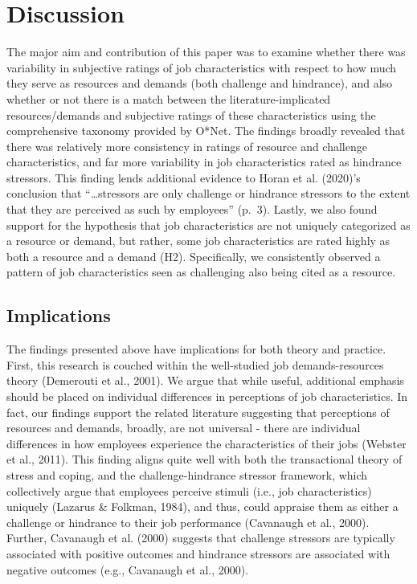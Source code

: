 \documentclass[
  english,
  man]{apa6}
\begin{document}
\hypertarget{discussion}{%
\section{Discussion}\label{discussion}}

The major aim and contribution of this paper was to examine whether there was variability in subjective ratings of job characteristics with respect to how much they serve as resources and demands (both challenge and hindrance), and also whether or not there is a match between the literature-implicated resources/demands and subjective ratings of these characteristics using the comprehensive taxonomy provided by O*Net. The findings broadly revealed that there was relatively more consistency in ratings of resource and challenge characteristics, and far more variability in job characteristics rated as hindrance stressors. This finding lends additional evidence to Horan et al. (2020)'s conclusion that ``\ldots stressors are only challenge or hindrance stressors to the extent that they are perceived as such by employees'' (p.~3). Lastly, we also found support for the hypothesis that job characteristics are not uniquely categorized as a resource or demand, but rather, some job characteristics are rated highly as both a resource and a demand (H2). Specifically, we consistently observed a pattern of job characteristics seen as challenging also being cited as a resource.

\hypertarget{implications}{%
\subsection{Implications}\label{implications}}

The findings presented above have implications for both theory and practice. First, this research is couched within the well-studied job demands-resources theory (Demerouti et al., 2001). We argue that while useful, additional emphasis should be placed on individual differences in perceptions of job characteristics. In fact, our findings support the related literature suggesting that perceptions of resources and demands, broadly, are not universal - there are individual differences in how employees experience the characteristics of their jobs (Webster et al., 2011). This finding aligns quite well with both the transactional theory of stress and coping, and the challenge-hindrance stressor framework, which collectively argue that employees perceive stimuli (i.e., job characteristics) uniquely (Lazarus \& Folkman, 1984), and thus, could appraise them as either a challenge or hindrance to their job performance (Cavanaugh et al., 2000). Further, Cavanaugh et al. (2000) suggests that challenge stressors are typically associated with positive outcomes and hindrance stressors are associated with negative outcomes (e.g., Cavanaugh et al., 2000).
\end{document}
